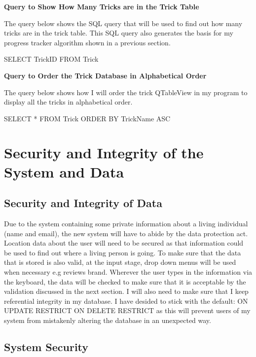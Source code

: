 \textbf{Query to Show How Many Tricks are in the Trick Table}

The query below shows the SQL query that will be used to find out how many tricks are in the trick table. This SQL query also generates the basis for my progress tracker algorithm shown in a previous section.
\begin{sql}
SELECT TrickID
FROM Trick
\end{sql}

\textbf{Query to Order the Trick Database in Alphabetical Order}

The query below shows how I will order the trick QTableView in my program to display all the tricks in alphabetical order.

\begin{sql}
SELECT *
FROM Trick
ORDER BY TrickName ASC
\end{sql}





\section{Security and Integrity of the System and Data}

\subsection{Security and Integrity of Data}

Due to the system containing some private information about a living individual (name and email), the new system will have to abide by the data protection act. Location data about the user will need to be secured as that information could be used to find out where a living person is going. To make sure that the data that is stored is also valid, at the input stage, drop down menus will be used when necessary e.g reviews brand. Wherever the user types in the information via the keyboard, the data will be checked to make sure that it is acceptable by the validation discussed in the next section. I will also need to make sure that I keep referential integrity in my database. I have desided to stick with the default: ON UPDATE RESTRICT ON DELETE RESTRICT as this will prevent users of my system from mistakenly altering the database in an unexpected way.
\subsection{System Security}

